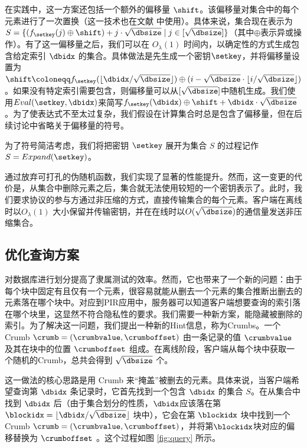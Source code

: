 在实践中，这一方案还包括一个额外的偏移量 $\shift$。该偏移量对集合中的每个元素进行了一次置换（这一技术也在文献 \cite{EC:CorKog20, C:LazPap23} 中使用）。具体来说，集合现在表示为$S = \{(f_{\setkey}(j)\oplus \shift) + j \cdot \sqrt{\dbsize} \mid j \in [\sqrt{\dbsize}]\}$（其中$\oplus$表示异或操作）。有了这一偏移量之后，我们可以在 $O_\lambda(1)$ 时间内，以确定性的方式生成包含给定索引 $\dbidx$ 的集合。具体做法是先生成一个密钥$\setkey$，并将偏移量设置为$\shift \coloneqq f_{\setkey}(\lfloor \dbidx/\sqrt{\dbsize}\rfloor) \oplus (i - \sqrt{\dbsize}\cdot\lfloor i/\sqrt{\dbsize}\rfloor)$。如果没有特定索引需要包含，则偏移量可以从$[\sqrt{\dbsize}]$中随机生成。我们使用$Eval(\setkey,\dbidx)$来简写$f_{\setkey}(\dbidx)\oplus \shift + \dbidx\cdot\sqrt{\dbsize}$。为了使表达式不至太过复杂，我们假设在计算集合时总是包含了偏移量，但在后续讨论中省略关于偏移量的符号。

为了符号简洁考虑，我们将把密钥 $\setkey$ 展开为集合 $S$ 的过程记作 $S = Expand(\setkey)$。

通过放弃可打孔的伪随机函数，我们实现了显著的性能提升。然而，这一变更的代价是，从集合中删除元素之后，集合就无法使用较短的一个密钥表示了。此时，我们要求协议的参与方通过非压缩的方式，直接传输集合的每个元素。客户端在离线时以$O_\lambda(1)$ 大小保留并传输密钥，并在在线时以$O(\sqrt{\dbsize})$的通信量发送非压缩集合。

\subsection{优化查询方案}
\label{sec:problem-of-dividing}
对数据库进行划分提高了隶属测试的效率。然而，它也带来了一个新的问题：由于每个块中固定有且仅有一个元素，很容易就能从删去一个元素的集合推断出删去的元素落在哪个块中。对应到PIR应用中，服务器可以知道客户端想要查询的索引落在哪个块里，这显然不符合隐私性的要求。我们需要一种新方案，能隐藏被删除的索引。为了解决这一问题，我们提出一种新的Hint信息，称为Crumbs。一个 Crumb $\crumb=(\crumbvalue, \crumboffset)$ 由一条记录的值 $\crumbvalue$ 及其在块中的位置 $\crumboffset$ 组成。在离线阶段，客户端从每个块中获取一个随机的Crumb，总共会得到 $\sqrt{\dbsize}$ 个。

这一做法的核心思路是用 Crumb 来“掩盖”被删去的元素。具体来说，当客户端希望查询第 $\dbidx$ 条记录时，它首先找到一个包含 $\dbidx$ 的集合 $S$。在从集合中找到 $\dbidx$ 后（由于集合划分的性质，$\dbidx$应该落在第$\blockidx = \lfloor \dbidx/\sqrt{\dbsize} \rfloor$ 块中），它会在第 $\blockidx$ 块中找到一个 Crumb $\crumb=(\crumbvalue, \crumboffset)$，并将第$\blockidx$块对应的偏移替换为 $\crumboffset$ 。这个过程如图 \ref{fig:query} 所示。

